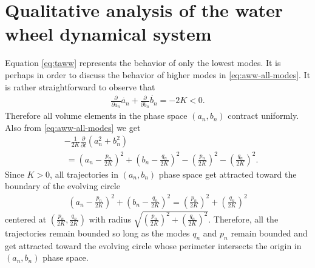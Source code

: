 \section{Qualitative analysis of the water wheel dynamical system} \label{sec:qa}
Equation \eqref{eq:taww} represents the behavior of only the lowest modes. It is perhaps in order to discuss the behavior of higher modes in \eqref{eq:aww-all-modes}. It is rather straightforward to observe that
\begin{align} \label{eq:vol-cont}
\frac{\partial}{\partial a_n} \dot{a_n} + \frac{\partial}{\partial b_n} \dot{b_n} =-2K <0.
\end{align}
Therefore all volume elements in the phase space $(a_n,b_n)$ contract uniformly. Also from \eqref{eq:aww-all-modes} we get
$$\begin{aligned}
& -\frac{1}{2K} \frac{\partial}{\partial t} \left(a_n^2 +b_n^2\right) \\
& ~ = \left(a_n -\frac{p_n}{2K}\right)^2 +\left(b_n -\frac{q_n}{2K}\right)^2 -\left( \frac{p_n}{2K}\right)^2 -\left( \frac{q_n}{2K}\right)^2.
\end{aligned}$$
Since $K>0$, all trajectories in $(a_n,b_n)$ phase space get attracted toward the boundary of the evolving circle
\begin{align} \label{eq:evol-circle}
\left(a_n -\frac{p_n}{2K}\right)^2 +\left(b_n -\frac{q_n}{2K}\right)^2 =\left( \frac{p_n}{2K}\right)^2 +\left( \frac{q_n}{2K}\right)^2
\end{align}
centered at $\left(\frac{p_n}{2K},\frac{q_n}{2K} \right)$ with radius $\sqrt{\left(\frac{p_n}{2K}\right)^2 +\left(\frac{q_n}{2K}\right)^2}$.
Therefore, all the trajectories remain bounded so long as the modes $q_n$ and $p_n$ remain bounded and get attracted toward the evolving circle whose perimeter intersects the origin in $(a_n,b_n)$ phase space. 

